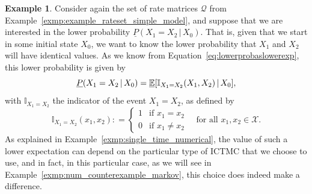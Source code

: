 \documentclass[10pt,a4paper]{paper}
\theoremstyle{definition}
\newtheorem{exmp}{Example}
\newcommand{\states}{\mathcal{X}}
\newcommand{\ind}[1]{\mathbb{I}_{#1}}
\newcommand{\rateset}{\mathcal{Q}}
\newcommand{\coloneqq}{:\!=}
\newcommand{\ictmc}{{ICTMC}}
\begin{document}
\begin{exmp}\label{exmp:num_multivar_func_nonmarkov}
Consider again the set of rate matrices $\rateset$ from Example~\ref{exmp:example_rateset_simple_model}, and suppose that we are interested in the lower probability $\underline{P}(X_1 = X_2\,\vert\, X_0)$. That is, given that we start in some initial state $X_0$, we want to know the lower probability that $X_1$ and $X_2$ will have identical values. %
As we know from Equation~\eqref{eq:lowerprobaslowerexp}, this lower probability is given by
\begin{equation*}
\underline{P}(X_1 = X_2\,\vert\, X_0) = \underline{\mathbb{E}}[
\ind{X_1=X_2}(X_1,X_2)\,\vert\,X_0],\vspace{4pt}
\end{equation*}
with $\ind{X_1=X_2}$ the indicator of the event $X_1=X_2$, as defined by
\begin{equation*}
\ind{X_1=X_2}(x_1,x_2) \coloneqq
\begin{cases}
1 & \text{if $x_1 = x_2$} \\
0 & \text{if $x_1 \neq x_2$}
\end{cases}
~~~\text{ for all $x_1,x_2\in\states$.}
\end{equation*}
As explained in Example~\ref{exmp:single_time_numerical}, the value of such a lower expectation can depend on the particular type of {\ictmc} that we choose to use, and in fact, in this particular case, as we will see in Example~\ref{exmp:num_counterexample_markov}, this choice does indeed make a difference. 


\end{exmp}
\end{document}

